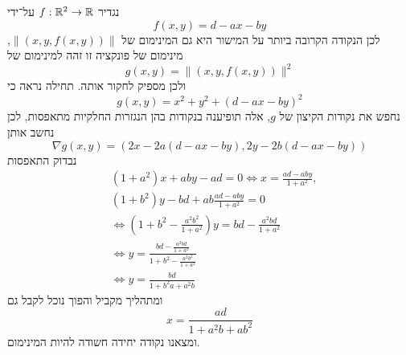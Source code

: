נגדיר $f : \mathbb{R}^2 \to \mathbb{R}$ על־ידי
\[
	f(x, y) = d - ax - by
\]
לכן הנקודה הקרובה ביותר על המישור היא גם המינימום של $\lVert (x, y, f(x, y)) \rVert$, מינימום של פונקציה זו זהה למינימום של
\[
	g(x, y) = \lVert (x, y, f(x, y)) \rVert^2
\]
ולכן מספיק לחקור אותה.
תחילה נראה כי
\[
	g(x, y) = x^2 + y^2 + {(d - ax - by)}^2
\]
נחפש את נקודות הקיצון של $g$, אלה תופיענה בנקודות בהן הנגזרות החלקיות מתאפסות, לכן נחשב אותן
\[
	\nabla g (x, y) = (2x - 2a(d - ax - by), 2y - 2b(d - ax - by) )
\]
נבדוק התאפסות
\begin{align*}
	& (1 + a^2) x + ab y - ad = 0
	\iff x = \frac{ad - ab y}{1 + a^2}, \\
	& (1 + b^2) y - bd + ab \frac{ad - aby}{1 + a^2} = 0 \\
	& \iff (1 + b^2 - \frac{a^2b^2}{1 + a^2}) y = bd - \frac{a^2bd}{1 + a^2} \\
	& \iff y = \frac{bd - \frac{a^2bd}{1 + a^2}}{1 + b^2 - \frac{a^2b^2}{1 + a^2}} \\
	& \iff y = \frac{bd}{1 + b^2a + a^2b}
\end{align*}
ומתהליך מקביל והפוך נוכל לקבל גם
\[
	x = \frac{ad}{1 + a^2b + ab^2}
\]
ומצאנו נקודה יחידה חשודה להיות המינימום.


